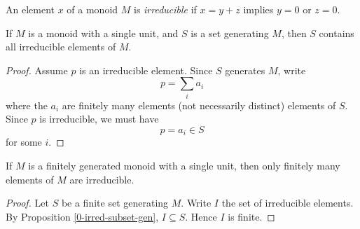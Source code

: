 \begin{definition}
  \label{0-irred}
  \uses{}
  \leanok

  An element $x$ of a monoid $M$ is \emph{irreducible} if $x = y + z$ implies $y = 0$ or $z = 0$.
\end{definition}


\begin{proposition}
  \label{0-irred-subset-gen}
  \leanok

  If $M$ is a monoid with a single unit, and $S$ is a set generating $M$, then $S$ contains all irreducible elements of $M$.
\end{proposition}
\begin{proof}
  \uses{}
  \leanok

  Assume $p$ is an irreducible element. Since $S$ generates $M$, write
  \[
    p = \sum_i a_i
  \]
  where the $a_i$ are finitely many elements (not necessarily distinct) elements of $S$. Since $p$ is irreducible, we must have
  \[
    p = a_i \in S
  \]
  for some $i$.
\end{proof}


\begin{proposition}
  \label{0-irred-finite}
  \leanok

  If $M$ is a finitely generated monoid with a single unit, then only finitely many elements of $M$ are irreducible.
\end{proposition}
\begin{proof}
  \leanok

  Let $S$ be a finite set generating $M$. Write $I$ the set of irreducible elements. By Proposition \ref{0-irred-subset-gen}, $I \subseteq S$. Hence $I$ is finite.
\end{proof}


